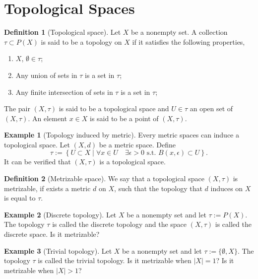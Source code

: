 \documentclass[11pt,a4paper]{article}
\theoremstyle{definition}
\newtheorem{definition}{Definition}[section]
\newtheorem{example}{Example}[section]
\theoremstyle{plain}
\newcommand{\st}{\text{ s.t. }}
\newcommand{\set}[2]{ \left\{ #1 \mid #2 \right\} }
\begin{document}
  \newpage

  \section{Topological Spaces}\label{sec:topological-spaces}
  \begin{definition}[Topological space]
    Let $X$ be a nonempty set. A collection $\tau \subset P(X)$ is said to
    be a topology on $X$ if it satisfies the following properties,
    \begin{enumerate}
      \item[(1)] $X$, $\emptyset \in \tau$;
      \item[(2)] Any union of sets in $\tau$ is a set in $\tau$;
      \item[(3)] Any finite intersection of sets in $\tau$ is a set in $\tau$;
    \end{enumerate}
    The pair $(X,\tau)$ is said to be a topological space and $U \in \tau$
    an open set of $(X,\tau)$. An element $x \in X$ is said to be a point
    of $(X,\tau)$.
  \end{definition}

  \begin{example}[Topology induced by metric]
    Every metric spaces can induce a topological space. Let $(X,d)$ be a
    metric space. Define
    \[
      \tau := \set{U \subset X}{\forall x \in U \quad \exists \epsilon > 0
      \st B(x,\epsilon) \subset U}.
    \]
    It can be verified that $(X,\tau)$ is a topological space.
  \end{example}

  \begin{definition}[Metrizable space]
    We say that a topological space $(X,\tau)$ is metrizable, if exists a 
    metric $d$ on $X$, such that the topology that $d$ induces on $X$
    is equal to $\tau$.
  \end{definition}

  \begin{example}[Discrete topology]
    Let $X$ be a nonempty set and let $\tau := P(X)$. The topology $\tau$
    is called the discrete topology and the space $(X,\tau)$ is called the 
    discrete space. Is it metrizable?
  \end{example}

  \begin{example}[Trivial topology]
    Let $X$ be a nonempty set and let $\tau := \{\emptyset,X\}$. The topology 
    $\tau$ is called the trivial topology. Is it metrizable when $|X| = 1$?
    Is it metrizable when $|X| > 1$?
  \end{example}
\end{document}
